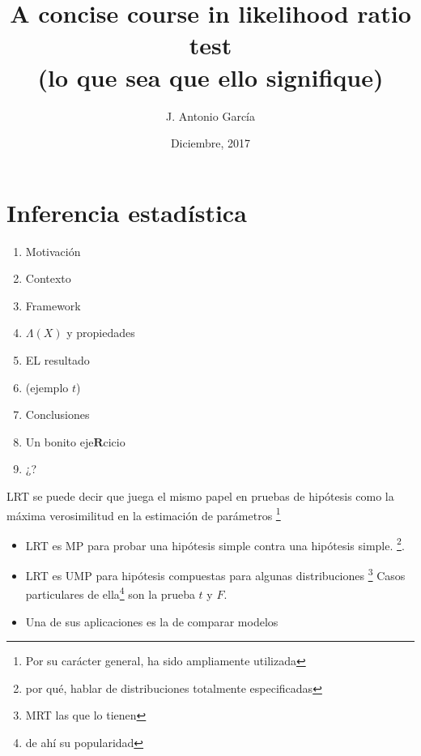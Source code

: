 \documentclass{beamer}
\newenvironment{cframed}[1][blue]
  {\begin{tcolorbox}[colframe=#1,colback=white]}
  {\end{tcolorbox}}
\begin{document}
	\title{A concise course in likelihood ratio test\\ \small{(lo que sea que ello signifique) }}
\author{ %
J. Antonio García }
				\date{Diciembre, 2017}
\frame{\titlepage}
\section{ Inferencia estadística}

\begin{frame}
\begin{enumerate}

\item  Motivación 
\item Contexto
\item Framework
\item $\Lambda(X)$ y propiedades 
\item EL resultado 
\item (ejemplo $t$)
\item Conclusiones
\item Un bonito eje$\mathbf{R}$cicio
\item ¿?
\end{enumerate}
\end{frame}

\begin{frame}
\begin{cframed}[violet]
LRT se puede decir que juega el mismo papel en pruebas de hipótesis como la máxima verosimilitud en la estimación de parámetros \footnote{Por su carácter general, ha sido ampliamente utilizada}
\end{cframed}
\begin{itemize}
\item LRT es MP para probar una hipótesis simple contra una hipótesis simple. \footnote{por qué, hablar de distribuciones totalmente especificadas}.

\item LRT es UMP para hipótesis compuestas para algunas distribuciones \footnote{ MRT las que lo tienen}
Casos particulares de ella\footnote{de ahí su popularidad} son la prueba $t$ y $F$. 

\item Una de sus aplicaciones es la de comparar modelos
\end{itemize}
\end{frame}
\end{document}
